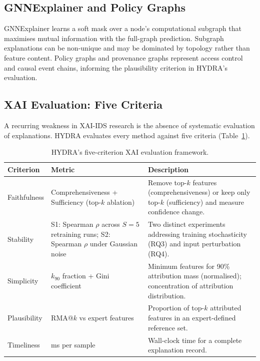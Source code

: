 \documentclass[12pt,a4paper]{report}
\begin{document}
\subsection{GNNExplainer and Policy Graphs}
\label{sec:gnnexplainer}

GNNExplainer \cite{ying2019} learns a soft mask over a node's computational subgraph that maximises mutual information with the full-graph prediction. Subgraph explanations can be non-unique and may be dominated by topology rather than feature content. Policy graphs \cite{alves2017} and provenance graphs \cite{fang2022} represent access control and causal event chains, informing the plausibility criterion in HYDRA's evaluation.

\subsection{XAI Evaluation: Five Criteria}
\label{sec:xai-eval}

A recurring weakness in XAI-IDS research is the absence of systematic evaluation of explanations. HYDRA evaluates every method against five criteria (Table~\ref{tab:five-criteria}).

\begin{table}[H]
\centering
\caption{HYDRA's five-criterion XAI evaluation framework.}
\label{tab:five-criteria}
\small
\begin{tabularx}{\textwidth}{lp{3.5cm}X}
\toprule
\textbf{Criterion} & \textbf{Metric} & \textbf{Description} \\
\midrule
Faithfulness & Comprehensiveness + Sufficiency (top-$k$ ablation) & Remove top-$k$ features (comprehensiveness) or keep only top-$k$ (sufficiency) and measure confidence change. \\
\addlinespace
Stability & S1: Spearman $\rho$ across $S = 5$ retraining runs; S2: Spearman $\rho$ under Gaussian noise & Two distinct experiments addressing training stochasticity (RQ3) and input perturbation (RQ4). \\
\addlinespace
Simplicity & $k_{90}$ fraction + Gini coefficient & Minimum features for 90\% attribution mass (normalised); concentration of attribution distribution. \\
\addlinespace
Plausibility & RMA@$k$ vs expert features & Proportion of top-$k$ attributed features in an expert-defined reference set. \\
\addlinespace
Timeliness & ms per sample & Wall-clock time for a complete explanation record. \\
\bottomrule
\end{tabularx}
\end{table}
\end{document}
